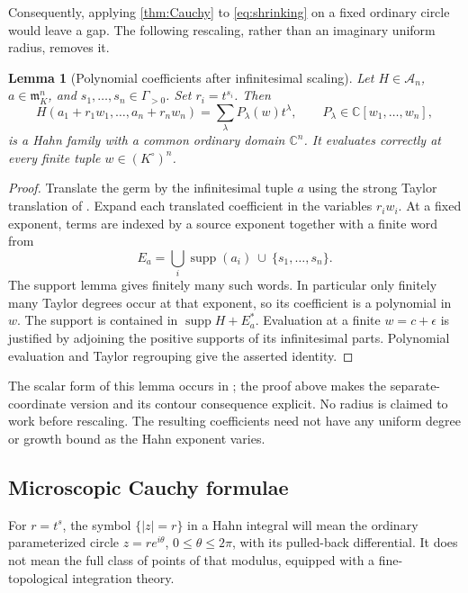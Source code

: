 \documentclass[11pt,letterpaper]{article}
\newtheorem{lemma}[theorem]{Lemma}
\theoremstyle{definition}
\theoremstyle{remark}
\newcommand{\C}{\mathbb C}
\newcommand{\Acal}{\mathscr A}
\newcommand{\m}{\mathfrak m}
\newcommand{\supp}{\operatorname{supp}}
\numberwithin{equation}{section}
\begin{document}
Consequently, applying \cref{thm:Cauchy} to \eqref{eq:shrinking} on a fixed ordinary circle would leave a gap. The following rescaling, rather than an imaginary uniform radius, removes it.

\begin{lemma}[Polynomial coefficients after infinitesimal scaling]\label{lem:scaling}
Let $H\in\Acal_n$, $a\in\m_K^n$, and $s_1,\ldots,s_n\in\Gamma_{>0}$. Set $r_i=t^{s_i}$. Then
\begin{equation}\label{eq:scaled}
H(a_1+r_1w_1,\ldots,a_n+r_nw_n)
=\sum_\lambda P_\lambda(w)t^\lambda,
\qquad P_\lambda\in\C[w_1,\ldots,w_n],
\end{equation}
is a Hahn family with a common ordinary domain $\C^n$. It evaluates correctly at every finite tuple $w\in(K^\circ)^n$.
\end{lemma}
\begin{proof}
Translate the germ by the infinitesimal tuple $a$ using the strong Taylor translation of \cite[\S3]{AG}. Expand each translated coefficient in the variables $r_iw_i$. At a fixed exponent, terms are indexed by a source exponent together with a finite word from
\[
E_a=\bigcup_i\supp(a_i)\ \cup\ \{s_1,\ldots,s_n\}.
\]
The support lemma gives finitely many such words. In particular only finitely many Taylor degrees occur at that exponent, so its coefficient is a polynomial in $w$. The support is contained in $\supp H+E_a^*$. Evaluation at a finite $w=c+\epsilon$ is justified by adjoining the positive supports of its infinitesimal parts. Polynomial evaluation and Taylor regrouping give the asserted identity.
\end{proof}
The scalar form of this lemma occurs in \cite[Lemma 10.1]{AG}; the proof above makes the separate-coordinate version and its contour consequence explicit. No radius is claimed to work before rescaling. The resulting coefficients need not have any uniform degree or growth bound as the Hahn exponent varies.

\subsection{Microscopic Cauchy formulae}
For $r=t^s$, the symbol $\{|z|=r\}$ in a Hahn integral will mean the ordinary parameterized circle $z=r e^{i\theta}$, $0\le\theta\le2\pi$, with its pulled-back differential. It does not mean the full class of points of that modulus, equipped with a fine-topological integration theory.
\end{document}
